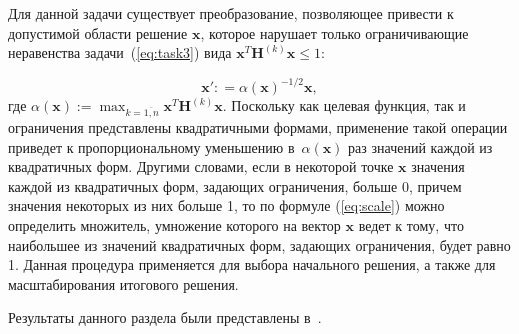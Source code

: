 Для данной задачи существует преобразование, позволяющее привести к допустимой области решение $\textbf{x}$, которое нарушает только ограничивающие неравенства задачи~(\ref{eq:task3}) вида $\textbf{x}^{T}\textbf{H}^{(k)}\textbf{x} \leq 1$:

\begin{equation}
    \textbf{x}': =\alpha(\textbf{x})^{-1/2} \textbf{x} ,
    \label{eq:scale}
\end{equation}
где $\alpha(\textbf{x}):=\max_{k=\overline{1,n}} \textbf{x}^T \textbf{H}^{(k)}\textbf{x}$. Поскольку как целевая функция, так и ограничения представлены квадратичными формами, применение такой операции приведет к пропорциональному уменьшению в~$\alpha(\textbf{x})$ раз значений каждой из квадратичных форм. Другими словами, если в некоторой точке $\textbf{x}$ значения каждой из квадратичных форм, задающих ограничения, больше 0, причем значения некоторых из них больше 1, то по формуле (\ref{eq:scale}) можно определить множитель, умножение которого на вектор $\textbf{x}$ ведет к тому, что наибольшее из значений квадратичных форм, задающих ограничения, будет равно 1. Данная процедура применяется для выбора начального решения, а также для масштабирования итогового решения.

Результаты данного раздела были представлены в~\cite{tyu:daor,tyu:opta,tyu:fmh}.